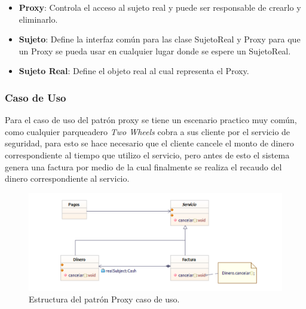 \begin{itemize}
	\item \textbf{Proxy}: Controla el acceso al sujeto real y puede ser responsable de crearlo y eliminarlo.
	\item \textbf{Sujeto}: Define la interfaz común para las clase SujetoReal y Proxy para que un Proxy se pueda usar en cualquier lugar donde se espere un SujetoReal.
	\item \textbf{Sujeto Real}: Define el objeto real al cual representa el Proxy.
\end{itemize}	


\subsubsection{Caso de Uso}
Para el caso de uso del patrón proxy se tiene un escenario practico muy común, como cualquier parqueadero \textit{Two Wheels} cobra a sus cliente por el servicio de seguridad, para esto se hace necesario que el cliente cancele el monto de dinero correspondiente al tiempo que utilizo el servicio, pero antes de esto el sistema genera una factura por medio de la cual finalmente se realiza el recaudo del dinero correspondiente al servicio.

\begin{figure}[th!]
	\centering
	\includegraphics[width=.8\linewidth]{imagenes/Patrones/Proxy_caso.pdf}
	\caption{Estructura del patrón Proxy caso de uso.\cite{gof}}	
\end{figure}


